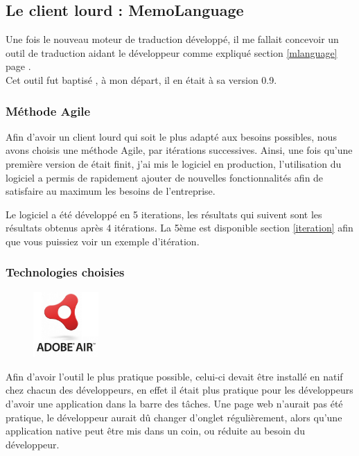     \subsection{Le client lourd : MemoLanguage}
        Une fois le nouveau moteur de traduction développé, il me fallait concevoir un outil de traduction aidant le développeur comme expliqué section \ref{mlanguage} page \pageref{mlanguage}. \\
        Cet outil fut baptisé \mlanguage{}, à mon départ, il en était à sa version 0.9.
        \subsubsection{Méthode Agile}
            Afin d'avoir un client lourd qui soit le plus adapté aux besoins possibles, nous avons choisis une méthode Agile, par itérations successives. Ainsi, une fois qu'une première version de \mlanguage{} était finit, j'ai mis le logiciel en production, l'utilisation du logiciel a permis de rapidement ajouter de nouvelles fonctionnalités afin de satisfaire au maximum les besoins de l'entreprise.

            Le logiciel a été développé en 5 iterations, les résultats qui suivent sont les résultats obtenus après 4 itérations. La 5ème est disponible section \ref{iteration} afin que vous puissiez voir un exemple d'itération.
        \subsubsection{Technologies choisies}

       \begin{figure}
            \includegraphics[width=2.5cm]{images/2-activite/air.jpg}
        \end{figure}
        Afin d'avoir l'outil le plus pratique possible, celui-ci devait être installé en natif chez chacun des développeurs, en effet il était plus pratique pour les développeurs d'avoir une application dans la barre des tâches. Une page web n'aurait pas été pratique, le développeur aurait dû changer d'onglet régulièrement, alors qu'une application native peut être mis dans un coin, ou réduite au besoin du développeur.

